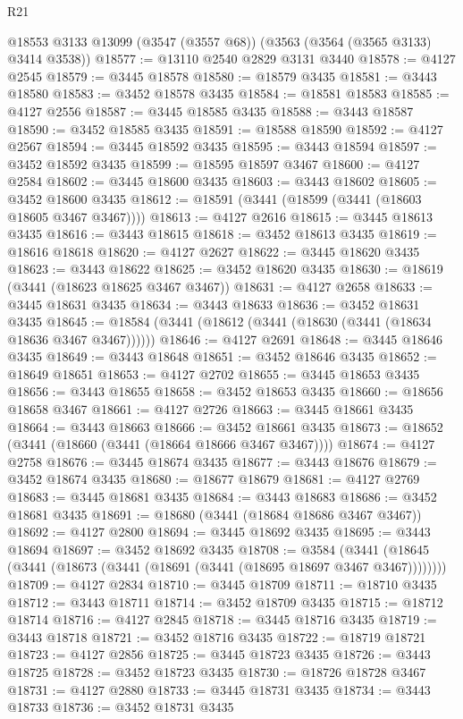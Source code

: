 \begin{lexlean}{R21}
\begin{coremodule}
    @18553
    @3133
    @13099
    (@3547 (@3557 @68))
    (@3563 (@3564 (@3565 @3133) @3414 @3538))
@18577 := @13110 @2540 @2829 @3131 @3440
@18578 := @4127 @2545
@18579 := @3445 @18578
@18580 := @18579 @3435
@18581 := @3443 @18580
@18583 := @3452 @18578 @3435
@18584 := @18581 @18583
@18585 := @4127 @2556
@18587 := @3445 @18585 @3435
@18588 := @3443 @18587
@18590 := @3452 @18585 @3435
@18591 := @18588 @18590
@18592 := @4127 @2567
@18594 := @3445 @18592 @3435
@18595 := @3443 @18594
@18597 := @3452 @18592 @3435
@18599 := @18595 @18597 @3467
@18600 := @4127 @2584
@18602 := @3445 @18600 @3435
@18603 := @3443 @18602
@18605 := @3452 @18600 @3435
@18612 := @18591 (@3441 (@18599 (@3441 (@18603 @18605 @3467 @3467))))
@18613 := @4127 @2616
@18615 := @3445 @18613 @3435
@18616 := @3443 @18615
@18618 := @3452 @18613 @3435
@18619 := @18616 @18618
@18620 := @4127 @2627
@18622 := @3445 @18620 @3435
@18623 := @3443 @18622
@18625 := @3452 @18620 @3435
@18630 := @18619 (@3441 (@18623 @18625 @3467 @3467))
@18631 := @4127 @2658
@18633 := @3445 @18631 @3435
@18634 := @3443 @18633
@18636 := @3452 @18631 @3435
@18645 := @18584 (@3441 (@18612 (@3441 (@18630 (@3441 (@18634 @18636 @3467 @3467))))))
@18646 := @4127 @2691
@18648 := @3445 @18646 @3435
@18649 := @3443 @18648
@18651 := @3452 @18646 @3435
@18652 := @18649 @18651
@18653 := @4127 @2702
@18655 := @3445 @18653 @3435
@18656 := @3443 @18655
@18658 := @3452 @18653 @3435
@18660 := @18656 @18658 @3467
@18661 := @4127 @2726
@18663 := @3445 @18661 @3435
@18664 := @3443 @18663
@18666 := @3452 @18661 @3435
@18673 := @18652 (@3441 (@18660 (@3441 (@18664 @18666 @3467 @3467))))
@18674 := @4127 @2758
@18676 := @3445 @18674 @3435
@18677 := @3443 @18676
@18679 := @3452 @18674 @3435
@18680 := @18677 @18679
@18681 := @4127 @2769
@18683 := @3445 @18681 @3435
@18684 := @3443 @18683
@18686 := @3452 @18681 @3435
@18691 := @18680 (@3441 (@18684 @18686 @3467 @3467))
@18692 := @4127 @2800
@18694 := @3445 @18692 @3435
@18695 := @3443 @18694
@18697 := @3452 @18692 @3435
@18708 := @3584
    (@3441 (@18645 (@3441 (@18673 (@3441 (@18691 (@3441 (@18695 @18697 @3467 @3467))))))))
@18709 := @4127 @2834
@18710 := @3445 @18709
@18711 := @18710 @3435
@18712 := @3443 @18711
@18714 := @3452 @18709 @3435
@18715 := @18712 @18714
@18716 := @4127 @2845
@18718 := @3445 @18716 @3435
@18719 := @3443 @18718
@18721 := @3452 @18716 @3435
@18722 := @18719 @18721
@18723 := @4127 @2856
@18725 := @3445 @18723 @3435
@18726 := @3443 @18725
@18728 := @3452 @18723 @3435
@18730 := @18726 @18728 @3467
@18731 := @4127 @2880
@18733 := @3445 @18731 @3435
@18734 := @3443 @18733
@18736 := @3452 @18731 @3435

\end{coremodule}
\end{lexlean}
